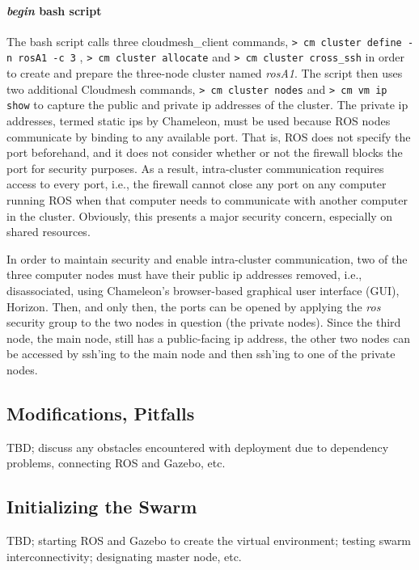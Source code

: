 \documentclass[9pt,twocolumn,twoside]{../../styles/osajnl}
\begin{document}
\paragraph{\textit{begin} bash script}
The bash script calls three cloudmesh\_client commands, {\color{green} \lstinline[style=BashInputStyle]!> cm cluster define -n rosA1 -c 3! }, {\color{green} \lstinline[style=BashInputStyle]!> cm cluster allocate! } and {\color{green} \lstinline[style=BashInputStyle]!> cm cluster cross_ssh! } in order to create and prepare the three-node cluster named \textit{rosA1}.  The script then uses two additional Cloudmesh commands, {\color{green} \lstinline[style=BashInputStyle]!> cm cluster nodes! } and {\color{green} \lstinline[style=BashInputStyle]!> cm vm ip show! } to capture the public and private ip addresses of the cluster.  The private ip addresses, termed static ips by Chameleon, must be used because ROS nodes communicate by binding to any available port.  That is, ROS does not specify the port beforehand, and it does not consider whether or not the firewall blocks the port for security purposes.  As a result, intra-cluster communication requires access to every port, i.e., the firewall cannot close any port on any computer running ROS when that computer needs to communicate with another computer in the cluster.  Obviously, this presents a major security concern, especially on shared resources. 

In order to maintain security and enable intra-cluster communication, two of the three computer nodes must have their public ip addresses removed, i.e., disassociated, using Chameleon's browser-based graphical user interface (GUI), Horizon.  Then, and only then, the ports can be opened by applying the \textit{ros} security group to the two nodes in question (the private nodes).  Since the third node, the main node, still has a public-facing ip address, the other two nodes can be accessed by ssh'ing to the main node and then ssh'ing to one of the private nodes.



\subsection{Modifications, Pitfalls}
TBD; discuss any obstacles encountered with deployment due to dependency problems, connecting ROS and Gazebo, etc.
\subsection{Initializing the Swarm}
TBD; starting ROS and Gazebo to create the virtual environment; testing swarm interconnectivity; designating master node, etc.
\end{document}
